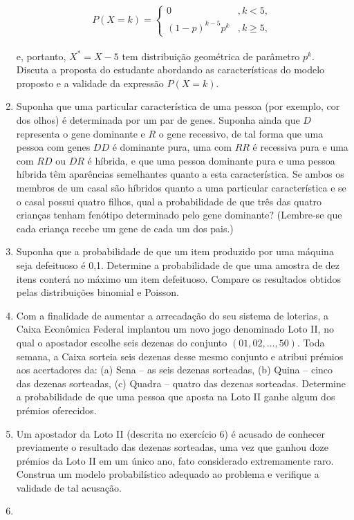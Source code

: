 \documentclass[
  10pt,
]{article}
\begin{document}
\begin{enumerate}
  \[P(X = k) =  
  \begin{cases}  
  0 & , k < 5, \\  
  (1 - p)^{k-5}p^k & , k \geq 5,  
  \end{cases}\]\\
  e, portanto, \(X^* = X - 5\) tem distribuição geométrica de parâmetro
  \(p^k\). Discuta a proposta do estudante abordando as características
  do modelo proposto e a validade da expressão \(P(X = k)\).
\item
  Suponha que uma particular característica de uma pessoa (por exemplo,
  cor dos olhos) é determinada por um par de genes. Suponha ainda que
  \(D\) representa o gene dominante e \(R\) o gene recessivo, de tal
  forma que uma pessoa com genes \(DD\) é dominante pura, uma com \(RR\)
  é recessiva pura e uma com \(RD\) ou \(DR\) é híbrida, e que uma
  pessoa dominante pura e uma pessoa híbrida têm aparências semelhantes
  quanto a esta característica. Se ambos os membros de um casal são
  híbridos quanto a uma particular característica e se o casal possui
  quatro filhos, qual a probabilidade de que três das quatro crianças
  tenham fenótipo determinado pelo gene dominante? (Lembre-se que cada
  criança recebe um gene de cada um dos pais.)
\item
  Suponha que a probabilidade de que um item produzido por uma máquina
  seja defeituoso é 0,1. Determine a probabilidade de que uma amostra de
  dez itens conterá no máximo um item defeituoso. Compare os resultados
  obtidos pelas distribuições binomial e Poisson.
\item
  Com a finalidade de aumentar a arrecadação do seu sistema de loterias,
  a Caixa Econômica Federal implantou um novo jogo denominado Loto II,
  no qual o apostador escolhe seis dezenas do conjunto
  \((01, 02, \ldots, 50)\). Toda semana, a Caixa sorteia seis dezenas
  desse mesmo conjunto e atribui prémios aos acertadores da: (a) Sena --
  as seis dezenas sorteadas, (b) Quina -- cinco das dezenas sorteadas,
  (c) Quadra -- quatro das dezenas sorteadas. Determine a probabilidade
  de que uma pessoa que aposta na Loto II ganhe algum dos prémios
  oferecidos.
\item
  Um apostador da Loto II (descrita no exercício 6) é acusado de
  conhecer previamente o resultado das dezenas sorteadas, uma vez que
  ganhou doze prémios da Loto II em um único ano, fato considerado
  extremamente raro. Construa um modelo probabilístico adequado ao
  problema e verifique a validade de tal acusação.
\item

\end{enumerate}
\end{document}
